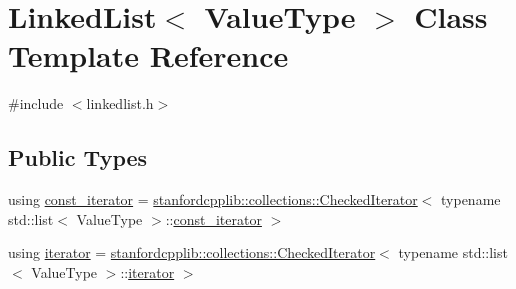 \hypertarget{classLinkedList}{}\section{Linked\+List$<$ Value\+Type $>$ Class Template Reference}
\label{classLinkedList}


{\ttfamily \#include $<$linkedlist.\+h$>$}

\subsection*{Public Types}
\begin{DoxyCompactItemize}
\item 
using \mbox{\hyperlink{classLinkedList_a3b9d37bc4aeea14213d403a3b30a230f}{const\+\_\+iterator}} = \mbox{\hyperlink{classstanfordcpplib_1_1collections_1_1CheckedIterator}{stanfordcpplib\+::collections\+::\+Checked\+Iterator}}$<$ typename std\+::list$<$ Value\+Type $>$\+::\mbox{\hyperlink{classLinkedList_a3b9d37bc4aeea14213d403a3b30a230f}{const\+\_\+iterator}} $>$
\item 
using \mbox{\hyperlink{classLinkedList_a50754c96f45bbb0f50e145fd70de6615}{iterator}} = \mbox{\hyperlink{classstanfordcpplib_1_1collections_1_1CheckedIterator}{stanfordcpplib\+::collections\+::\+Checked\+Iterator}}$<$ typename std\+::list$<$ Value\+Type $>$\+::\mbox{\hyperlink{classLinkedList_a50754c96f45bbb0f50e145fd70de6615}{iterator}} $>$
\end{DoxyCompactItemize}
